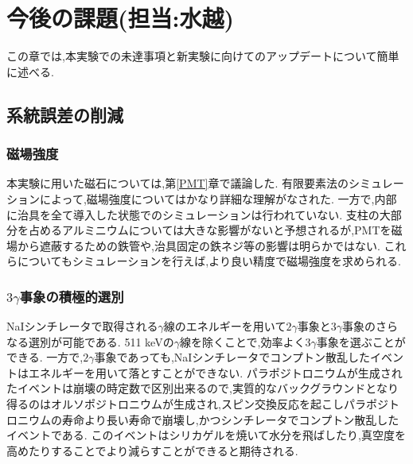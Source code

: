 \chapter{今後の課題(担当:水越)}\label{prospect}

この章では,本実験での未達事項と新実験に向けてのアップデートについて簡単に述べる.


\section{系統誤差の削減}


\subsection{磁場強度}
本実験に用いた磁石については,第\ref{PMT}章で議論した.
有限要素法のシミュレーションによって,磁場強度についてはかなり詳細な理解がなされた.
一方で,内部に治具を全て導入した状態でのシミュレーションは行われていない.
支柱の大部分を占めるアルミニウムについては大きな影響がないと予想されるが,PMTを磁場から遮蔽するための鉄管や,治具固定の鉄ネジ等の影響は明らかではない.
これらについてもシミュレーションを行えば,より良い精度で磁場強度を求められる.

\subsection{$3\gamma$事象の積極的選別}
NaIシンチレータで取得される$\gamma$線のエネルギーを用いて$2\gamma$事象と$3\gamma$事象のさらなる選別が可能である.
511 keVの$\gamma$線を除くことで,効率よく$3\gamma$事象を選ぶことができる.
一方で,$2\gamma$事象であっても,NaIシンチレータでコンプトン散乱したイベントはエネルギーを用いて落とすことができない.
パラポジトロニウムが生成されたイベントは崩壊の時定数で区別出来るので,実質的なバックグラウンドとなり得るのはオルソポジトロニウムが生成され,スピン交換反応を起こしパラポジトロニウムの寿命より長い寿命で崩壊し,かつシンチレータでコンプトン散乱したイベントである.
このイベントはシリカゲルを焼いて水分を飛ばしたり,真空度を高めたりすることでより減らすことができると期待される.

